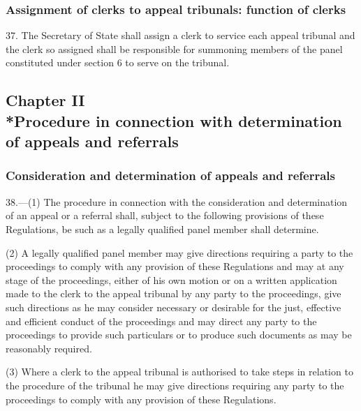 \documentclass[12pt,a4paper]{article}
\begin{document}
\subsubsection[37. Assignment of clerks to appeal tribunals: function of clerks]{Assignment of clerks to appeal tribunals: function of clerks}

37.  The Secretary of State shall assign a clerk to service each appeal tribunal and the clerk so assigned shall be responsible for summoning members of the panel constituted under section 6 to serve on the tribunal.

\subsection[Chapter II --- Procedure in connection with determination of appeals and referrals]{Chapter II\\*Procedure in connection with determination of appeals and referrals}

\renewcommand\parthead{--- Part V Chapter II}

\subsubsection[38. Consideration and determination of appeals and referrals]{Consideration and determination of appeals and referrals}

38.—(1) The procedure in connection with the consideration and determination of an appeal or a referral shall, subject to the following provisions of these Regulations, be such as a legally qualified panel member shall determine.

(2) A legally qualified panel member may give directions requiring a party to the proceedings to comply with any provision of these Regulations and may at any stage of the proceedings, either of his own motion or on a written application made to the clerk to the appeal tribunal by any party to the proceedings, give such directions as he may consider necessary or desirable for the just, effective and efficient conduct of the proceedings and may direct any party to the proceedings to provide such particulars or to produce such documents as may be reasonably required.

(3) Where a clerk to the appeal tribunal is authorised to take steps in relation to the procedure of the tribunal he may give directions requiring any party to the proceedings to comply with any provision of these Regulations.

\end{document}
